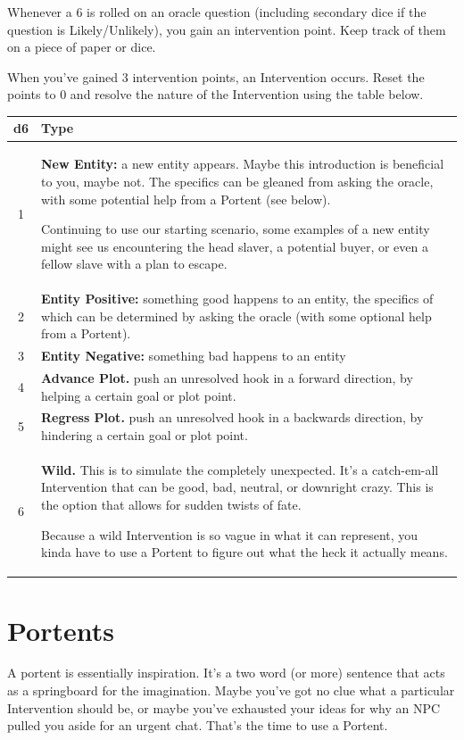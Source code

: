 \documentclass[12pt, letterpaper]{article}
\begin{document}
Whenever a 6 is rolled on an oracle question (including secondary dice if the question is Likely/Unlikely), you gain an intervention point. Keep track of them on a piece of paper or dice.

When you've gained 3 intervention points, an Intervention occurs. Reset the points to 0 and resolve the nature of the Intervention using the table below.

\noindent\begin{tabularx}{\linewidth}{|c|X|}
\hline
\textbf{d6} & \textbf{Type} \\
\hline
1 & \textbf{New Entity:} a new entity appears. Maybe this introduction is beneficial to you, maybe not. The specifics can be gleaned from asking the oracle, with some potential help from a Portent (see below).\par\smallskip
Continuing to use our starting scenario, some examples of a new entity might see us encountering the head slaver, a potential buyer, or even a fellow slave with a plan to escape. \\
\hline
2 & \textbf{Entity Positive:} something good happens to an entity, the specifics of which can be determined by asking the oracle (with some optional help from a Portent). \\
\hline
3 & \textbf{Entity Negative:} something bad happens to an entity \\
\hline
4 & \textbf{Advance Plot.} push an unresolved hook in a forward direction, by helping a certain goal or plot point. \\
\hline
5 & \textbf{Regress Plot.} push an unresolved hook in a backwards direction, by hindering a certain goal or plot point. \\
\hline
6 & \textbf{Wild.} This is to simulate the completely unexpected. It's a catch-em-all Intervention that can be good, bad, neutral, or downright crazy. This is the option that allows for sudden twists of fate.\par\smallskip
Because a wild Intervention is so vague in what it can represent, you kinda have to use a Portent to figure out what the heck it actually means. \\
\hline
\end{tabularx}

\section*{Portents}

A portent is essentially inspiration. It's a two word (or more) sentence that acts as a springboard for the imagination. Maybe you've got no clue what a particular Intervention should be, or maybe you've exhausted your ideas for why an NPC pulled you aside for an urgent chat. That's the time to use a Portent.
\end{document}
